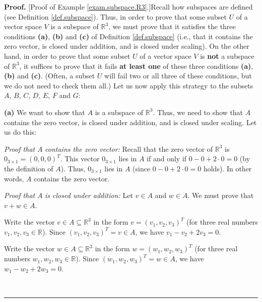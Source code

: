 \documentclass[numbers=enddot,12pt,final,onecolumn,notitlepage]{scrartcl}%
\theoremstyle{definition}
\newenvironment{proof}[1][Proof]{\noindent\textbf{#1.} }{\ \rule{0.5em}{0.5em}}
\begin{document}
\begin{proof}
[Proof of Example \ref{exam.subspace.R3}.]Recall how subspaces are defined
(see Definition \ref{def.subspace}). Thus, in order to prove that some subset
$U$ of a vector space $V$ is a subspace of $\mathbb{R}^{3}$, we must prove
that it satisfies the three conditions \textbf{(a)}, \textbf{(b)} and
\textbf{(c)} of Definition \ref{def.subspace} (i.e., that it contains the zero
vector, is closed under addition, and is closed under scaling). On the other
hand, in order to prove that some subset $U$ of a vector space $V$ is
\textbf{not} a subspace of $\mathbb{R}^{3}$, it suffices to prove that it
fails \textbf{at least one} of these three conditions \textbf{(a)},
\textbf{(b)} and \textbf{(c)}. (Often, a subset $U$ will fail two or all three
of these conditions, but we do not need to check them all.) Let us now apply
this strategy to the subsets $A$, $B$, $C$, $D$, $E$, $F$ and $G$:

\textbf{(a)} We want to show that $A$ is a subspace of $\mathbb{R}^{3}$. Thus,
we need to show that $A$ contains the zero vector, is closed under addition,
and is closed under scaling. Let us do this:

\textit{Proof that }$A$\textit{ contains the zero vector:} Recall that the
zero vector of $\mathbb{R}^{3}$ is $0_{3\times1}=\left(  0,0,0\right)  ^{T}$.
This vector $0_{3\times1}$ lies in $A$ if and only if $0-0+2\cdot0=0$ (by the
definition of $A$). Thus, $0_{3\times1}$ lies in $A$ (since $0-0+2\cdot0=0$
holds). In other words, $A$ contains the zero vector.

\textit{Proof that }$A$ \textit{is closed under addition:} Let $v\in A$ and
$w\in A$. We must prove that $v+w\in A$.

Write the vector $v\in A\subseteq\mathbb{R}^{3}$ in the form $v=\left(
v_{1},v_{2},v_{3}\right)  ^{T}$ (for three real numbers $v_{1},v_{2},v_{3}%
\in\mathbb{R}$). Since $\left(  v_{1},v_{2},v_{3}\right)  ^{T}=v\in A$, we
have $v_{1}-v_{2}+2v_{3}=0$.

Write the vector $w\in A\subseteq\mathbb{R}^{3}$ in the form $w=\left(
w_{1},w_{2},w_{3}\right)  ^{T}$ (for three real numbers $w_{1},w_{2},w_{3}%
\in\mathbb{R}$). Since $\left(  w_{1},w_{2},w_{3}\right)  ^{T}=w\in A$, we
have $w_{1}-w_{2}+2w_{3}=0$.


\end{proof}
\end{document}

